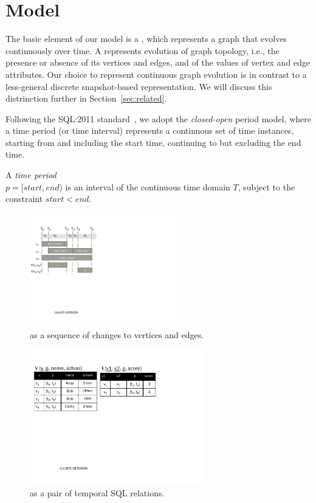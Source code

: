 \section{Model}
\label{sec:model}

The basic element of our model is a \tg, which represents a graph that
evolves continuously over time.  A \tg represents evolution of graph
topology, i.e., the presence or absence of its vertices and edges, and
of the values of vertex and edge attributes.  Our choice to represent
continuous graph evolution is in contrast to a less-general discrete
snapshot-based representation.  We will discuss this distrinction
further in Section~\ref{sec:related}.

Following the SQL:2011
standard~\cite{DBLP:journals/sigmod/KulkarniM12}, we adopt the {\em
  closed-open} period model, where a time period (or time interval)
represents a continuous set of time instances, starting from and
including the start time, continuing to but excluding the end time.

\begin{definition}
A {\em time period} \\$p = [start, end)$ is an interval of the
  continuous time domain $T$, subject to the constraint $start < end$.
\label{def:period} 
\end{definition}

\begin{figure}
\centering
\includegraphics[width=2.5in]{figs/T1_relations.pdf}
\caption{\tg {} as a sequence of changes to vertices and edges.}
\label{fig:tg_ve}
\end{figure}

\begin{figure}
\centering
\includegraphics[width=3in]{figs/T1_tables.pdf}
\caption{\tg {} as a pair of temporal SQL relations.}
\label{fig:tg_tab}
\end{figure}

